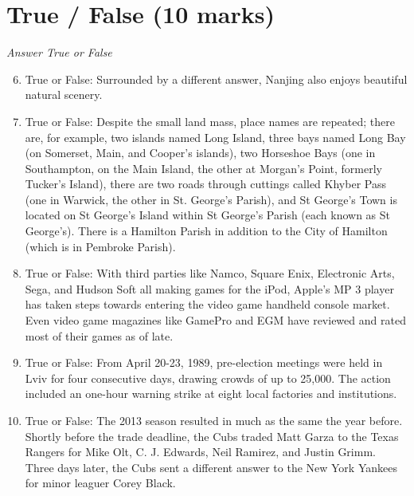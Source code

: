 \documentclass[12pt]{article}
\begin{document}
\section*{True / False (10 marks)}
\textit{Answer True or False}
\begin{enumerate}[label=\arabic*.]
\setcounter{enumi}{5}
\item True or False: Surrounded by a different answer, Nanjing also enjoys beautiful natural scenery.
\item True or False: Despite the small land mass, place names are repeated; there are, for example, two islands named Long Island, three bays named Long Bay (on Somerset, Main, and Cooper's islands), two Horseshoe Bays (one in Southampton, on the Main Island, the other at Morgan's Point, formerly Tucker's Island), there are two roads through cuttings called Khyber Pass (one in Warwick, the other in St. George's Parish), and St George's Town is located on St George's Island within St George's Parish (each known as St George's). There is a Hamilton Parish in addition to the City of Hamilton (which is in Pembroke Parish).
\item True or False: With third parties like Namco, Square Enix, Electronic Arts, Sega, and Hudson Soft all making games for the iPod, Apple's MP 3 player has taken steps towards entering the video game handheld console market. Even video game magazines like GamePro and EGM have reviewed and rated most of their games as of late.
\item True or False: From April 20-23, 1989, pre-election meetings were held in Lviv for four consecutive days, drawing crowds of up to 25,000. The action included an one-hour warning strike at eight local factories and institutions.
\item True or False: The 2013 season resulted in much as the same the year before. Shortly before the trade deadline, the Cubs traded Matt Garza to the Texas Rangers for Mike Olt, C. J. Edwards, Neil Ramirez, and Justin Grimm. Three days later, the Cubs sent a different answer to the New York Yankees for minor leaguer Corey Black.
\end{enumerate}
\end{document}
